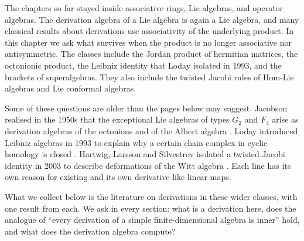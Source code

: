 The chapters so far stayed inside associative rings, Lie algebras, and
operator algebras. The derivation algebra of a Lie algebra is again a Lie
algebra, and many classical results about derivations use associativity of
the underlying product. In this chapter we ask what survives when the
product is no longer associative nor antisymmetric. The classes include
the Jordan product of hermitian matrices, the octonionic product, the
Leibniz identity that Loday isolated in 1993, and the brackets of
superalgebras. They also include the twisted Jacobi rules of Hom-Lie
algebras and Lie conformal algebras.

Some of these questions are older than the pages below may suggest. Jacobson
realised in the 1950s that the exceptional Lie algebras of types $G_2$ and
$F_4$ arise as derivation algebras of the octonions and of the Albert algebra
\cite[p.~52]{McCrimmon2004Taste}. Loday introduced Leibniz algebras in 1993 to
explain why a certain chain complex in cyclic homology is closed
\cite[p.~139]{LodayPirashvili1993}. Hartwig, Larsson and Silvestrov isolated a
twisted Jacobi identity in 2003 to describe deformations of the Witt algebra
\cite[p.~1]{HartwigLarssonSilvestrov2006}. Each line has its own reason for
existing and its own derivative-like linear maps.

What we collect below is the literature on derivations in these wider
classes, with one result from each. We ask in every section: what is a
derivation here, does the analogue of ``every derivation of a simple
finite-dimensional algebra is inner'' hold, and what does the derivation
algebra compute?

